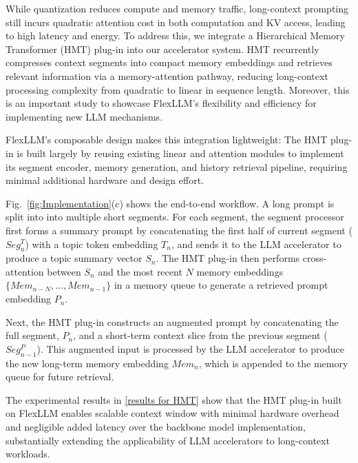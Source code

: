 \documentclass[conference]{IEEEtran}
\begin{document}

While quantization reduces compute and memory traffic, long-context prompting still incurs quadratic attention cost in both computation and KV access, leading to high latency and energy. To address this, we integrate a Hierarchical Memory Transformer (HMT) plug-in into our accelerator system. HMT recurrently compresses context segments into compact memory embeddings and retrieves relevant information via a memory-attention pathway, reducing long-context processing complexity from quadratic to linear in sequence length. Moreover, this is an important study to showcase FlexLLM's flexibility and efficiency for implementing new LLM mechanisms.

FlexLLM’s composable design makes this integration lightweight: The HMT plug-in is built largely by reusing existing linear and attention modules to implement its segment encoder, memory generation, and history retrieval pipeline, requiring minimal additional hardware and design effort.

Fig.~\ref{fig:Implementation}(c) shows the end-to-end workflow. A long prompt is split into into multiple short segments. For each segment, the segment processor first forms a summary prompt by concatenating the first half of current segment ($Seg_n^T$) with a topic token embedding $T_n$, and sends it to the LLM accelerator to produce a topic summary vector $S_n$. The HMT plug-in then performs cross-attention between $S_n$ and the most recent $N$ memory embeddings $\{Mem_{n-N},\dots,Mem_{n-1}\}$ in a memory queue to generate a retrieved prompt embedding $P_n$.

Next, the HMT plug-in constructs an augmented prompt by concatenating the full segment, $P_n$, and a short-term context slice from the previous segment ($Seg_{n-1}^P$). This augmented input is processed by the LLM accelerator to produce the new long-term memory embedding $Mem_n$, which is appended to the memory queue for future retrieval.

The experimental results in \ref{results for HMT} show that the HMT plug-in built on FlexLLM enables scalable context window with minimal hardware overhead and negligible added latency over the backbone model implementation, substantially extending the applicability of LLM accelerators to long-context workloads.
\end{document}
